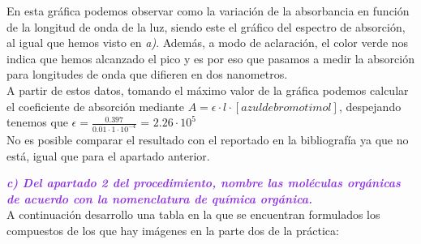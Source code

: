 \vspace{0.4cm}

\noindent En esta gráfica podemos observar como la variación de la absorbancia en función de la longitud de onda de la luz, siendo este el gráfico del espectro de absorción, al igual que hemos visto en \textit{a)}. Además, a modo de aclaración, el color verde nos indica que hemos alcanzado el pico y es por eso que pasamos a medir la absorción para longitudes de onda que difieren en dos nanometros.\\


\noindent A partir de estos datos, tomando el máximo valor de la gráfica podemos calcular el coeficiente de absorción mediante $A = \epsilon\cdot{l}\cdot{[azul de bromotimol]}$, despejando tenemos que $\epsilon = \frac{0.397}{0.01\cdot{1}\cdot 10^{-4}}$ = \underline{$2.26\cdot{10^{5}}$}\\

\noindent No es posible comparar el resultado con el reportado en la bibliografía ya que no está, igual que para el apartado anterior. 


\clearpage

\noindent\textcolor{BlueViolet}{\textbf{\textit{c) Del apartado 2 del procedimiento, nombre las moléculas orgánicas de acuerdo con la nomenclatura de química orgánica.}}}\\


\noindent A continuación desarrollo una tabla en la que se encuentran formulados los compuestos de los que hay imágenes en la parte dos de la práctica:\\

